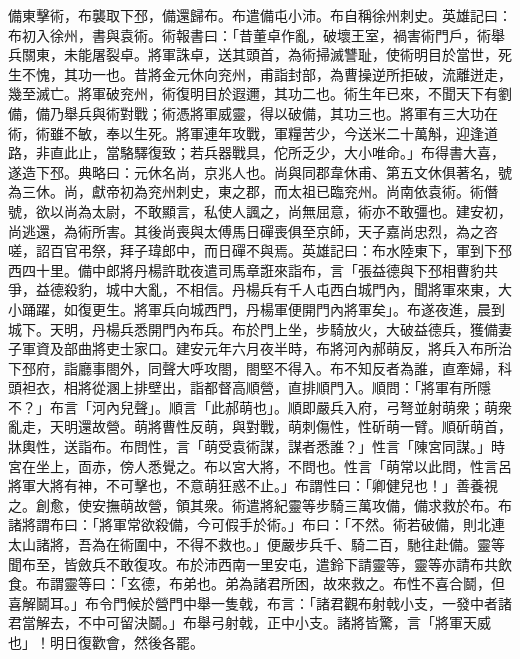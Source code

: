 \begin{pinyinscope}
備東擊術，布襲取下邳，備還歸布。布遣備屯小沛。布自稱徐州刺史。英雄記曰：布初入徐州，書與袁術。術報書曰：「昔董卓作亂，破壞王室，禍害術門戶，術舉兵關東，未能屠裂卓。將軍誅卓，送其頭首，為術掃滅讐耻，使術明目於當世，死生不愧，其功一也。昔將金元休向兖州，甫詣封部，為曹操逆所拒破，流離迸走，幾至滅亡。將軍破兖州，術復明目於遐邇，其功二也。術生年已來，不聞天下有劉備，備乃舉兵與術對戰；術憑將軍威靈，得以破備，其功三也。將軍有三大功在術，術雖不敏，奉以生死。將軍連年攻戰，軍糧苦少，今送米二十萬斛，迎逢道路，非直此止，當駱驛復致；若兵器戰具，佗所乏少，大小唯命。」布得書大喜，遂造下邳。典略曰：元休名尚，京兆人也。尚與同郡韋休甫、第五文休俱著名，號為三休。尚，獻帝初為兖州刺史，東之郡，而太祖已臨兖州。尚南依袁術。術僭號，欲以尚為太尉，不敢顯言，私使人諷之，尚無屈意，術亦不敢彊也。建安初，尚逃還，為術所害。其後尚喪與太傅馬日磾喪俱至京師，天子嘉尚忠烈，為之咨嗟，詔百官弔祭，拜子瑋郎中，而日磾不與焉。英雄記曰：布水陸東下，軍到下邳西四十里。備中郎將丹楊許耽夜遣司馬章誑來詣布，言「張益德與下邳相曹豹共爭，益德殺豹，城中大亂，不相信。丹楊兵有千人屯西白城門內，聞將軍來東，大小踊躍，如復更生。將軍兵向城西門，丹楊軍便開門內將軍矣」。布遂夜進，晨到城下。天明，丹楊兵悉開門內布兵。布於門上坐，步騎放火，大破益德兵，獲備妻子軍資及部曲將吏士家口。建安元年六月夜半時，布將河內郝萌反，將兵入布所治下邳府，詣廳事閤外，同聲大呼攻閤，閤堅不得入。布不知反者為誰，直牽婦，科頭袒衣，相將從溷上排壁出，詣都督高順營，直排順門入。順問：「將軍有所隱不？」布言「河內兒聲」。順言「此郝萌也」。順即嚴兵入府，弓弩並射萌衆；萌衆亂走，天明還故營。萌將曹性反萌，與對戰，萌刺傷性，性斫萌一臂。順斫萌首，牀輿性，送詣布。布問性，言「萌受袁術謀，謀者悉誰？」性言「陳宮同謀。」時宮在坐上，靣赤，傍人悉覺之。布以宮大將，不問也。性言「萌常以此問，性言呂將軍大將有神，不可擊也，不意萌狂惑不止。」布謂性曰：「卿健兒也！」善養視之。創愈，使安撫萌故營，領其衆。術遣將紀靈等步騎三萬攻備，備求救於布。布諸將謂布曰：「將軍常欲殺備，今可假手於術。」布曰：「不然。術若破備，則北連太山諸將，吾為在術圍中，不得不救也。」便嚴步兵千、騎二百，馳往赴備。靈等聞布至，皆斂兵不敢復攻。布於沛西南一里安屯，遣鈴下請靈等，靈等亦請布共飲食。布謂靈等曰：「玄德，布弟也。弟為諸君所困，故來救之。布性不喜合鬬，但喜解鬬耳。」布令門候於營門中舉一隻戟，布言：「諸君觀布射戟小支，一發中者諸君當解去，不中可留決鬬。」布舉弓射戟，正中小支。諸將皆驚，言「將軍天威也」！明日復歡會，然後各罷。


\end{pinyinscope}
